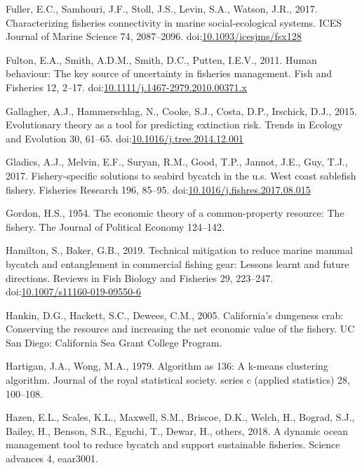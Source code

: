 \documentclass[]{elsarticle} %
\begin{document}
\leavevmode\hypertarget{ref-Fuller2017}{}%
Fuller, E.C., Samhouri, J.F., Stoll, J.S., Levin, S.A., Watson, J.R.,
2017. Characterizing fisheries connectivity in marine social-ecological
systems. ICES Journal of Marine Science 74, 2087--2096.
doi:\href{https://doi.org/10.1093/icesjms/fsx128}{10.1093/icesjms/fsx128}

\leavevmode\hypertarget{ref-Fulton2011}{}%
Fulton, E.A., Smith, A.D.M., Smith, D.C., Putten, I.E.V., 2011. Human
behaviour: The key source of uncertainty in fisheries management. Fish
and Fisheries 12, 2--17.
doi:\href{https://doi.org/10.1111/j.1467-2979.2010.00371.x}{10.1111/j.1467-2979.2010.00371.x}

\leavevmode\hypertarget{ref-Gallagher2015}{}%
Gallagher, A.J., Hammerschlag, N., Cooke, S.J., Costa, D.P., Irschick,
D.J., 2015. Evolutionary theory as a tool for predicting extinction
risk. Trends in Ecology and Evolution 30, 61--65.
doi:\href{https://doi.org/10.1016/j.tree.2014.12.001}{10.1016/j.tree.2014.12.001}

\leavevmode\hypertarget{ref-Gladics2017}{}%
Gladics, A.J., Melvin, E.F., Suryan, R.M., Good, T.P., Jannot, J.E.,
Guy, T.J., 2017. Fishery-specific solutions to seabird bycatch in the
u.s. West coast sablefish fishery. Fisheries Research 196, 85--95.
doi:\href{https://doi.org/10.1016/j.fishres.2017.08.015}{10.1016/j.fishres.2017.08.015}

\leavevmode\hypertarget{ref-Gordon1954}{}%
Gordon, H.S., 1954. The economic theory of a common-property resource:
The fishery. The Journal of Political Economy 124--142.

\leavevmode\hypertarget{ref-Hamilton2019}{}%
Hamilton, S., Baker, G.B., 2019. Technical mitigation to reduce marine
mammal bycatch and entanglement in commercial fishing gear: Lessons
learnt and future directions. Reviews in Fish Biology and Fisheries 29,
223--247.
doi:\href{https://doi.org/10.1007/s11160-019-09550-6}{10.1007/s11160-019-09550-6}

\leavevmode\hypertarget{ref-Hankin2005}{}%
Hankin, D.G., Hackett, S.C., Dewees, C.M., 2005. California's dungeness
crab: Conserving the resource and increasing the net economic value of
the fishery. UC San Diego: California Sea Grant College Program.

\leavevmode\hypertarget{ref-Hartigan1979}{}%
Hartigan, J.A., Wong, M.A., 1979. Algorithm as 136: A k-means clustering
algorithm. Journal of the royal statistical society. series c (applied
statistics) 28, 100--108.

\leavevmode\hypertarget{ref-Hazen2018}{}%
Hazen, E.L., Scales, K.L., Maxwell, S.M., Briscoe, D.K., Welch, H.,
Bograd, S.J., Bailey, H., Benson, S.R., Eguchi, T., Dewar, H., others,
2018. A dynamic ocean management tool to reduce bycatch and support
sustainable fisheries. Science advances 4, eaar3001.
\end{document}
